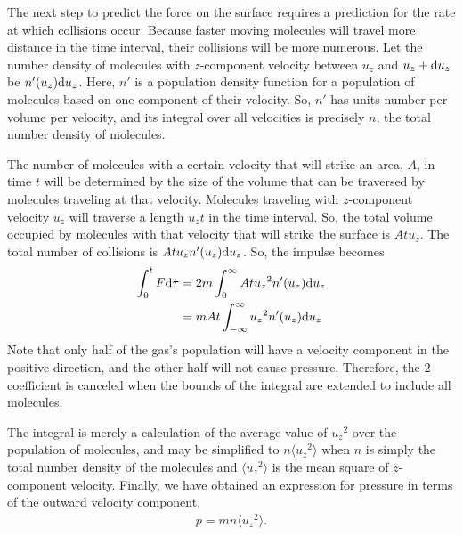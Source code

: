 The next step to predict the force on the surface requires a prediction for the rate at which  collisions occur.  Because faster moving molecules will travel more distance in the time interval, their collisions will be more numerous.  Let the number density of molecules with $z$-component velocity between $u_z$ and $u_z + \mathrm{d} u_z$ be $n'(u_z) \mathrm{d} u_z$.  Here, $n'$ is a population density function for a population of molecules based on one component of their velocity.  So, $n'$ has units number per volume per velocity, and its integral over all velocities is precisely $n$, the total number density of molecules.

The number of molecules with a certain velocity that will strike an area, $A$, in time $t$ will be determined by the size of the volume that can be traversed by molecules traveling at that velocity.  Molecules traveling with $z$-component velocity $u_z$ will traverse a length $u_z t$ in the time interval.  So, the total volume occupied by molecules with that velocity that will strike the surface is $A t u_z$.  The total number of collisions is $A t u_z n'(u_z) \mathrm{d} u_z$.  So, the impulse becomes
\begin{align}
\int_0^t F \mathrm{d} \tau &= 2 m \int_0^{\infty} A t u_z{^2} n'(u_z) \mathrm{d} u_z\nonumber\\
 &= m A t \int_{-\infty}^\infty u_z{^2} n'(u_z) \mathrm{d} u_z
\end{align}
Note that only half of the gas's population will have a velocity component in the positive direction, and the other half will not cause pressure.  Therefore, the 2 coefficient is canceled when the bounds of the integral are extended to include all molecules.

The integral is merely a calculation of the average value of $u_z{^2}$ over the population of molecules, and may be simplified to $n \langle u_z{^2} \rangle$ when $n$ is simply the total number density of the molecules and $\langle u_z{^2} \rangle$ is the mean square of $z$-component velocity.  Finally, we have obtained an expression for pressure in terms of the outward velocity component,
\begin{align}
p = m n \langle u_z{^2}\rangle.
\end{align}

